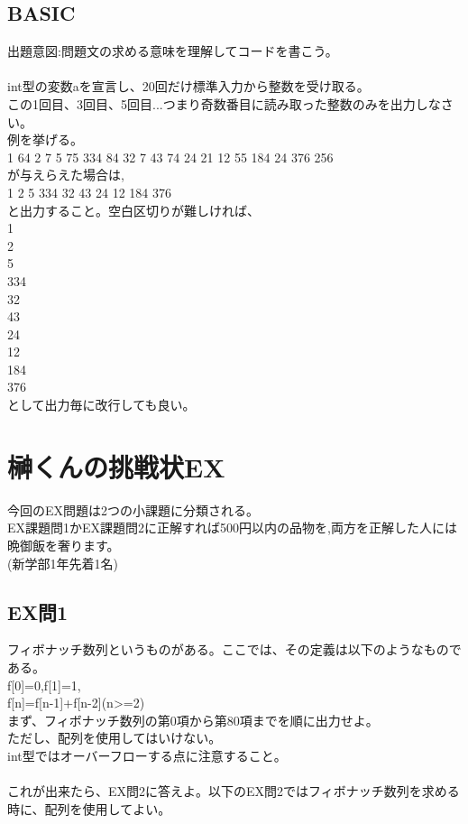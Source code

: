 \documentclass[a4j,titlepage,dvipdfmx]{jsarticle}   %
\begin{document}
\begin{itembox}
\begin{itembox}
\subsection{BASIC}
出題意図:問題文の求める意味を理解してコードを書こう。\\
\\
int型の変数aを宣言し、20回だけ標準入力から整数を受け取る。\\
この1回目、3回目、5回目...つまり奇数番目に読み取った整数のみを出力しなさい。\\
例を挙げる。\\
1 64 2 7 5 75 334 84 32 7 43 74 24 21 12 55 184 24 376 256\\
が与えらえた場合は,\\
1 2 5 334 32 43 24 12 184 376\\
と出力すること。空白区切りが難しければ、\\
1\\
2\\
5 \\
334 \\
32 \\
43 \\
24 \\
12 \\
184 \\
376\\
として出力毎に改行しても良い。\\

\section{榊くんの挑戦状EX}
今回のEX問題は2つの小課題に分類される。\\
EX課題問1かEX課題問2に正解すれば500円以内の品物を,両方を正解した人には晩御飯を奢ります。\\
(新学部1年先着1名)\\

\subsection{EX問1}
フィボナッチ数列というものがある。ここでは、その定義は以下のようなものである。\\
f[0]=0,f[1]=1,\\
f[n]=f[n-1]+f[n-2](n>=2)\\
まず、フィボナッチ数列の第0項から第80項までを順に出力せよ。\\
ただし、配列を使用してはいけない。\\
int型ではオーバーフローする点に注意すること。\\
\\
これが出来たら、EX問2に答えよ。以下のEX問2ではフィボナッチ数列を求める時に、配列を使用してよい。\\


\end{itembox}
\end{itembox}
\end{document}
